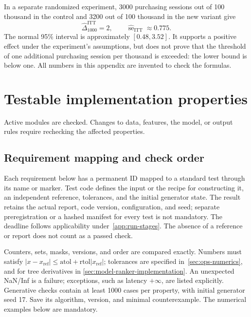 \documentclass[12pt,a4paper]{article}
\theoremstyle{plainru}
\begin{document}
In a separate randomized experiment, 3000 purchasing sessions out of 100 thousand in the control
and 3200 out of 100 thousand in the new variant give
\begin{equation}\label{eq:app-business-example}
\widehat\Delta_{1000}^{\mathrm{ITT}}=2,\qquad
\widehat{\operatorname{se}}_{\mathrm{ITT}}\approx0.775.
\end{equation}
The normal 95\% interval is approximately $[0.48,3.52]$.
It supports a positive effect under the experiment's
assumptions, but does not prove that the threshold of one additional
purchasing session per thousand is exceeded: the lower bound is below one.
All numbers in this appendix are invented to check the formulas.

\section{Testable implementation properties}\label{app:tests}

Active modules are checked. Changes to data, features, the model, or
output rules require rechecking the affected properties.

\subsection{Requirement mapping and check order}\label{app:tests-normative}

Each requirement below has a permanent ID mapped to a standard
test through its name or marker. Test code defines the input or the recipe for
constructing it, an independent reference, tolerances, and the initial generator state.
The result retains the actual report, code version, configuration, and seed;
separate preregistration or a hashed manifest for every
test is not mandatory. The deadline follows applicability under~\ref{app:run-stages}.
The absence of a reference or report does not count as a passed check.

Counters, sets, masks, versions, and order are compared exactly.
Numbers must satisfy
$|x-x_{\mathrm{ref}}|\le\mathrm{atol}+\mathrm{rtol}|x_{\mathrm{ref}}|$;
tolerances are specified in~\ref{sec:ops-numerics}, and for tree derivatives in
\ref{sec:model-ranker-implementation}. An unexpected NaN/Inf is
a failure; exceptions, such as latency $+\infty$, are listed explicitly.
Generative checks contain at least 1000 cases per property,
with initial generator seed 17. Save its algorithm, version,
and minimal counterexample. The numerical examples below are mandatory.
\end{document}
